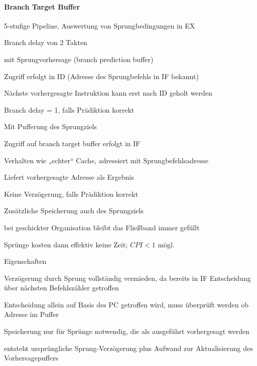\documentclass[a4paper]{article}
\begin{document}
\begin{multicols}{3}
  \paragraph{Branch Target Buffer}
  5-stufige Pipeline, Auswertung von Sprungbedingungen in EX
  \begin{itemize*}
    \item Branch delay von 2 Takten
    \item mit Sprungvorhersage (branch prediction buffer)
    \item Zugriff erfolgt in ID (Adresse des Sprungbefehls in IF bekannt)
    \item Nächste vorhergesagte Instruktion kann erst nach ID geholt werden
    \item Branch delay = 1, falls Prädiktion korrekt
    \item Mit Pufferung des Sprungziels
    \item Zugriff auf branch target buffer erfolgt in IF
    \item Verhalten wie „echter“ Cache, adressiert mit Sprungbefehlsadresse
    \item Liefert vorhergesagte Adresse als Ergebnis
    \item Keine Verzögerung, falls Prädiktion korrekt
    \item Zusätzliche Speicherung auch des Sprungziels
    \item bei geschickter Organisation bleibt das Fließband immer gefüllt
    \item Sprünge kosten dann effektiv keine Zeit; $CPI <1$ mögl.
  \end{itemize*}
  Eigenschaften
  \begin{itemize*}
    \item Verzögerung durch Sprung vollständig vermieden, da bereits in IF Entscheidung über nächsten Befehlszähler getroffen
    \item Entscheidung allein auf Basis des PC getroffen wird, muss überprüft werden ob Adresse im Puffer
    \item Speicherung nur für Sprünge notwendig, die als ausgeführt vorhergesagt werden
    \item entsteht ursprüngliche Sprung-Verzögerung plus Aufwand zur Aktualisierung des Vorhersagepuffers
  \end{itemize*}
  

\end{multicols}
\end{document}
